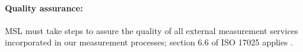 {\paragraph{Quality assurance:}
MSL must take steps to assure the quality of all external measurement services incorporated in our measurement processes; section 6.6 of ISO 17025 applies \cite{ISO_17025}. 
 

}

